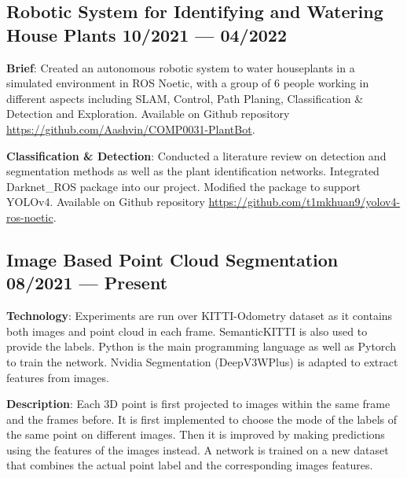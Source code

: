 
\subsection{{Robotic System for Identifying and Watering House Plants 
    \hfill 10/2021 --- 04/2022}}
\begin{zitemize}
    \item \textbf{Brief}: 
        Created an autonomous robotic system to water houseplants
        in a simulated environment in ROS Noetic, with a group of 6 people working in 
        different aspects including
        SLAM, Control, Path Planing, Classification \& Detection and Exploration.
        Available on Github repository
        \url{https://github.com/Aashvin/COMP0031-PlantBot}.
    \item \textbf{Classification \& Detection}: 
        Conducted a literature review on detection and 
        segmentation methods as well as the plant identification networks.
        Integrated Darknet\_ROS package into our project. 
        Modified the package to support YOLOv4.
        Available on Github repository
        \url{https://github.com/t1mkhuan9/yolov4-ros-noetic}.
\end{zitemize}

\subsection{{Image Based Point Cloud Segmentation 
    \hfill 08/2021 --- Present}}
\begin{zitemize}
    \item \textbf{Technology}: Experiments are run over KITTI-Odometry dataset 
        as it contains both images and point cloud in each frame.
        SemanticKITTI is also used to provide the labels.
        Python is the main programming language as well as Pytorch to train
        the network.
        Nvidia Segmentation (DeepV3WPlus) is adapted to extract features from 
        images.
    \item \textbf{Description}: Each 3D point is first projected to images within
        the same frame and the frames before. 
        It is first implemented to choose the mode of the labels of the same point
        on different images. 
        Then it is improved by making predictions using the features of the images
        instead.
        A network is trained on a new dataset that combines the actual point
        label and the corresponding images features. 
\end{zitemize}

